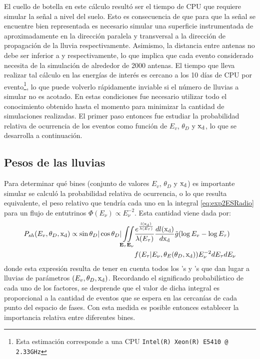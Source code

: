 El cuello de botella en este c\'alculo result\'o ser el tiempo de CPU que requiere simular la se\~nal a nivel del suelo.
Esto es consecuencia de que para que la se\~nal se encuentre bien representada es necesario simular una superficie instrumentada de aproximadamente  en la direcci\'on paralela y transversal a la direcci\'on de propagaci\'on de la lluvia respectivamente.
Asimismo, la distancia entre antenas no debe ser inferior a  y  respectivamente, lo que implica que cada evento considerado necesita de la simulaci\'on de alrededor de 2000 antenas.
El tiempo que lleva realizar tal c\'alculo en las energ\'ias de inter\'es es cercano a los 10 d\'ias de CPU por evento\footnote{Esta estimaci\'on corresponde a una CPU \texttt{Intel(R) Xeon(R) E5410 @ 2.33GHz}}, lo que puede volverlo r\'apidamente inviable si el n\'umero de lluvias a simular no es acotado.
En estas condiciones fue necesario utilizar todo el conocimiento obtenido hasta el momento para minimizar la cantidad de simulaciones realizadas.
El primer paso entonces fue estudiar la probabilidad relativa de ocurrencia de los eventos como funci\'on de $E_v$, $\theta_D$ y ${\rm x_d}$, lo que se desarrolla a continuaci\'on.
	
	\subsection{Pesos de las lluvias}
	Para determinar qu\'e bines (conjunto de valores $E_v$, $\theta_D$ y ${\rm x_d}$) es importante simular se calcul\'o la probabilidad relativa de ocurrencia, o lo que resulta equivalente, el peso relativo que tendr\'ia cada uno en la integral \ref{eq:exp2ESRadio} para un flujo de entutrinos $\Phi(E_\nu)\propto E_\nu^{-2}$.
	Esta cantidad viene dada por:
	\begin{equation}
		\begin{aligned}
			P_{sh}(E_v,\theta_D,{\rm x_d})
			\propto
			\sin{\theta_D}|\cos{\theta_D}|
			\iint\limits_{\mathbf{E_\tau}\mathbf{E_\nu}}&
			\frac{e^{\frac{l({\rm x_d})}{\lambda(E_\tau)}}}{\lambda(E_\tau)}\frac{dl({\rm x_d})}{d{\rm x_d}}
			\tilde{g}(\log E_v-\log E_\tau)\\
			&f(E_\tau|E_\nu,\theta_E(\theta_D,{\rm x_d}))
			E_\nu^{-2}
			dE_\tau dE_\nu
		\end{aligned}
		\label{eq:weightsRadio}
	\end{equation}
	donde esta expresi\'on resulta de tener en cuenta todos los \nutau{}'s y \tauon{}'s que dan lugar a lluvias de par\'ametros $(E_v,\theta_D,{\rm x_d})$.
	Recordando el significado probabil\'istico de cada uno de los factores, se desprende que el valor de dicha integral es proporcional a la cantidad de eventos que se espera en las cercan\'ias de cada punto del espacio de fases.
	Con esta medida es posible entonces establecer la importancia relativa entre diferentes bines.
	
